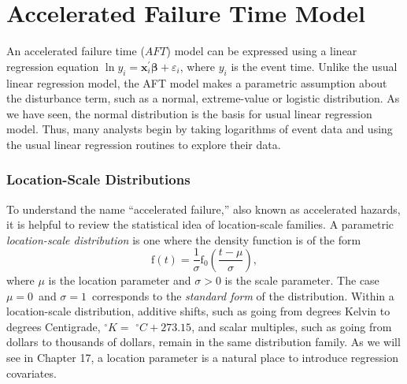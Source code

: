 \section{Accelerated Failure Time
Model}\label{S14:AFT}

An accelerated failure time ($AFT$) model can be expressed using a
linear regression equation $ \ln y_i = \mathbf{x}_i^{\prime}
\boldsymbol \beta + \varepsilon_i $, where $y_i$ is the event time.
Unlike the usual linear regression model, the AFT model makes a
parametric assumption about the disturbance term, such as a normal,
extreme-value or logistic distribution. As we have seen, the normal
distribution is the basis for usual linear regression model. Thus,
many analysts begin by taking logarithms of event data and using the
usual linear regression routines to explore their data.

\subsubsection*{Location-Scale
Distributions}

To understand the name ``accelerated failure,'' also known as
accelerated hazards, it is helpful to review the statistical idea of
location-scale families. A parametric \emph{location-scale
distribution} is one where the density function is of the form
\begin{equation*}
\mathrm{f}(t) =\frac{1}{\sigma }\mathrm{f}_0 \left( \frac{t-\mu
}{\sigma }\right) ,
\end{equation*}
where $\mu $ is the location parameter and $\sigma >0$ is the scale
parameter. The case $\mu =0$\ and $\sigma =1$\ corresponds to the
\emph{standard form} of the distribution. Within a location-scale
distribution, additive shifts, such as going from degrees Kelvin to
degrees Centigrade, $^{\circ }K=$ $^{\circ }C+273.15$, and scalar
multiples, such as going from dollars to thousands of dollars,
remain in the same distribution family. As we will see in Chapter
17, a location parameter is a natural place to introduce regression
covariates.

